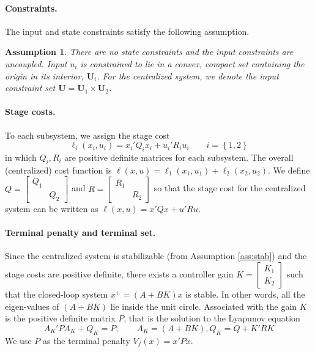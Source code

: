 \documentclass[10pt, twocolumn]{article}
\newcommand{\set}[1]{\left\lbrace #1 \right\rbrace}
\newtheorem{assumption}{Assumption}
\theoremstyle{definition}
\begin{document}
\paragraph {\textbf{Constraints.}} The input and state constraints satisfy the following assumption.
\begin{assumption}
\label{ass:const}
There are no state constraints and the input constraints are uncoupled. Input $u_i$ is constrained to lie in a convex, compact set containing the origin in its interior, $\mathbf{U}_i$. For the centralized system, we denote the input constraint set $\mathbf{U} = \mathbf{U}_1 \times \mathbf{U}_2$.
\end{assumption}

\paragraph{\textbf{Stage costs.}} To each subsystem, we assign the stage cost
\[ \ell_i(x_i,u_i) = x_i'Q_ix_i + u_i'R_iu_i \qquad  i = \set{1,2} 
\]
in which $Q_i,R_i$ are positive definite matrices for each subsystem. The overall (centralized) cost function is $\ell(x,u) = \ell_1(x_1,u_1)+\ell_2(x_2,u_2)$. We define $Q = \begin{bmatrix} Q_1 & \\ & Q_2 \end{bmatrix}$ and $R = \begin{bmatrix} R_1 & \\ & R_2 \end{bmatrix}$ so that the stage cost for the centralized system can be written as $\ell(x,u) = x'Qx+u'Ru$. 

\paragraph {\textbf{Terminal penalty and terminal set.}} Since the centralized system is stabilizable (from Assumption \ref{ass:stab}) and the stage costs are positive definite, there exists a controller gain $K = \begin{bmatrix} K_1\\K_2\end{bmatrix}$ such that the closed-loop system $x^+ = (A+BK)x$ is stable. In other words, all the eigen-values of $(A+BK)$ lie inside the unit circle. Associated with the gain $K$ is the positive definite matrix $P$, that is the solution to the Lyapunov equation
\[ A_K'PA_K + Q_K = P; \qquad A_K = (A+BK), Q_K = Q+K'RK\]
We use $P$ as the terminal penalty $V_f(x) = x'Px$. 
\end{document}
